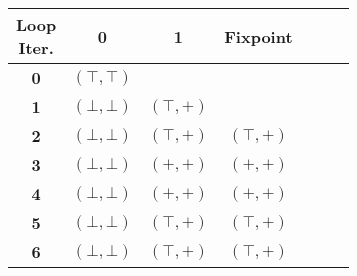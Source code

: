 \documentclass{article}
\begin{document}
\small

\begin{tabular}{*{7}{c}}
  \toprule
  \backslashbox{Lab.}{Loop\\Iter.} & 0 & 1 & Fixpoint  \\
  \midrule
  \textbf{0} & $(\top,\top)$ &  &  \\ \hline

  \textbf{1} & $(\bot,\bot)$ & $(\top,+)$  &  \\ \hline

  \textbf{2} & $(\bot,\bot)$ & $(\top,+)$    & $(\top,+)$     \\ \hline

  \textbf{3} & $(\bot,\bot)$ & $(+,+)$    & $(+,+)$  \\ \hline

  \textbf{4} & $(\bot,\bot)$ & $(+,+)$    & $(+,+)$ \\ \hline

  \textbf{5} & $(\bot,\bot)$ & $(\top,+)$ & $(\top, +)$ \\ \hline

  \textbf{6} & $(\bot,\bot)$ & $(\top,+)$ & $(\top, +)$ \\

  \bottomrule
\end{tabular}
\end{document}
